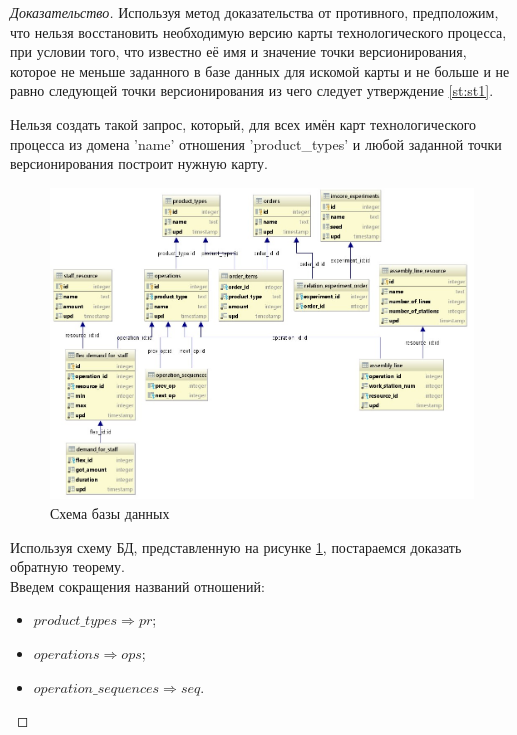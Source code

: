 \begin{proof}[Доказательство]
	Используя метод доказательства от противного, предположим, что нельзя восстановить необходимую версию карты технологического процесса, при условии того, что известно её имя и значение точки версионирования, которое не меньше заданного в базе данных для искомой карты и не больше и не равно следующей точки версионирования из чего следует утверждение \ref{st:st1}.
	\begin{state}
		\label{st:st1}
		Нельзя создать такой запрос, который, для всех имён карт технологического процесса из домена 'name' отношения 'product\_types' и любой заданной точки версионирования построит нужную карту.
	\end{state}

	\begin{figure}[ht]
		\centering
		\includegraphics[width=\linewidth]{pics/databaseSchema.png}
		\caption{Схема базы данных}
		\label{fig:dbschema}
	\end{figure}

	\indent Используя схему БД, представленную на рисунке \ref{fig:dbschema}, постараемся доказать обратную теорему.\\
	\indent Введем сокращения названий отношений:

	\begin{itemize}
		\item $product\_types \Rightarrow pr$;
		\item $operations \Rightarrow ops$;
		\item $operation\_sequences \Rightarrow seq$.
	\end{itemize}


\end{proof}
